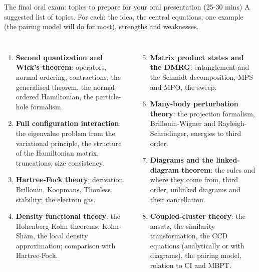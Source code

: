 \documentclass[aspectratio=169,10pt]{beamer}
\begin{document}
\begin{frame}[shrink=1]{The final oral exam: topics to prepare for your oral presentation (25-30 mins)}
\small
A suggested list of topics. For each: the idea, the central equations, one example (the pairing model will do for most), strengths and weaknesses.
\begin{columns}[T]
\begin{enumerate}
\item \textbf{Second quantization and Wick's theorem}: operators, normal ordering, contractions, the generalised theorem, the normal-ordered Hamiltonian, the particle-hole formalism.
\item \textbf{Full configuration interaction}: the eigenvalue problem from the variational principle, the structure of the Hamiltonian matrix, truncations, size consistency.
\item \textbf{Hartree-Fock theory}: derivation, Brillouin, Koopmans, Thouless, stability; the electron gas.
\item \textbf{Density functional theory}: the Hohenberg-Kohn theorems, Kohn-Sham, the local density approximation; comparison with Hartree-Fock.
\end{enumerate}
\begin{enumerate}\setcounter{enumi}{4}
\item \textbf{Matrix product states and the DMRG}: entanglement and the Schmidt decomposition, MPS and MPO, the sweep.
\item \textbf{Many-body perturbation theory}: the projection formalism, Brillouin-Wigner and Rayleigh-Schr\"odinger, energies to third order.
\item \textbf{Diagrams and the linked-diagram theorem}: the rules and where they come from, third order, unlinked diagrams and their cancellation.
\item \textbf{Coupled-cluster theory}: the ansatz, the similarity transformation, the CCD equations (analytically or with diagrams), the pairing model, relation to CI and MBPT.
\end{enumerate}
\end{columns}
\end{frame}
\end{document}
